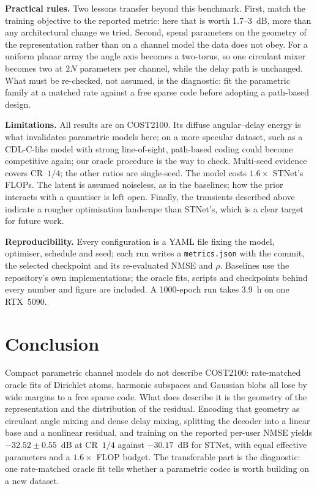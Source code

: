 \documentclass[journal]{IEEEtran}
\begin{document}
\textbf{Practical rules.} Two lessons transfer beyond this benchmark. First, match
the training objective to the reported metric: here that is worth 1.7--3~dB,
more than any architectural change we tried. Second, spend parameters on the geometry of
the representation rather than on a channel model the data does not obey. For a
uniform planar array the angle axis becomes a two-torus, so one circulant mixer
becomes two at $2N$ parameters per channel, while the delay path is unchanged. What
must be re-checked, not assumed, is the diagnostic: fit the parametric family at a
matched rate against a free sparse code before adopting a path-based design.

\textbf{Limitations.} All results are on COST2100. Its diffuse angular--delay
energy is what invalidates parametric models here; on a more specular dataset, such
as a CDL-C-like model with strong line-of-sight, path-based coding could become
competitive again; our oracle procedure is the way to check. Multi-seed
evidence covers CR~$1/4$; the other ratios are single-seed. The model costs
$1.6\times$ STNet's FLOPs. The latent is assumed noiseless, as in the baselines;
how the prior interacts with a quantiser is left open. Finally, the transients
described above indicate a rougher optimisation landscape than STNet's, which is a
clear target for future work.

\textbf{Reproducibility.} Every configuration is a YAML file fixing the model,
optimiser, schedule and seed; each run writes a \texttt{metrics.json} with the
commit, the selected checkpoint and its re-evaluated NMSE and $\rho$. Baselines use
the repository's own implementations; the oracle fits, scripts and checkpoints
behind every number and figure are included. A 1000-epoch run takes 3.9~h on one
RTX~5090.

\section{Conclusion}
Compact parametric channel models do not describe COST2100: rate-matched oracle
fits of Dirichlet atoms, harmonic subspaces and Gaussian blobs all lose by wide
margins to a free sparse code. What does describe it is the geometry of the
representation and the distribution of the residual. Encoding that geometry as
circulant angle mixing and dense delay mixing, splitting the decoder into a linear
base and a nonlinear residual, and training on the reported per-user NMSE yields
$-32.52\pm0.55$~dB at CR~$1/4$ against $-30.17$~dB for STNet, with equal
effective parameters and a $1.6\times$ FLOP budget. The transferable part is the
diagnostic: one rate-matched oracle fit tells whether a parametric codec is worth
building on a new dataset.
\end{document}
